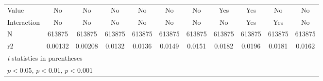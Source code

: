 {\begin{tabular}{l*{10}{c}}
\hline
Value               &          No         &          No         &          No         &          No         &          No         &          No         &         Yes         &         Yes         &          No         &          No         \\
Interaction         &          No         &          No         &          No         &          No         &          No         &          No         &          No         &         Yes         &         Yes         &          No         \\
N                   &      613875         &      613875         &      613875         &      613875         &      613875         &      613875         &      613875         &      613875         &      613875         &      613875         \\
r2                  &     0.00132         &     0.00208         &      0.0132         &      0.0136         &      0.0149         &      0.0151         &      0.0182         &      0.0196         &      0.0181         &      0.0162         \\
\hline\hline
\multicolumn{11}{l}{\footnotesize \textit{t} statistics in parentheses}\\
\multicolumn{11}{l}{\footnotesize \sym{*} \(p<0.05\), \sym{**} \(p<0.01\), \sym{***} \(p<0.001\)}\\
\end{tabular}
}
